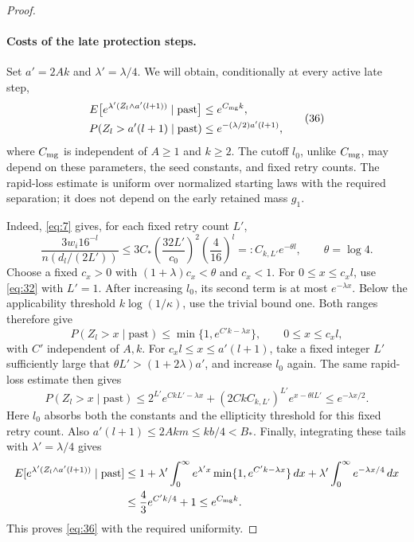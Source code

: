 \begin{proof}
\paragraph{Costs of the late protection steps.}
Set \(a'=2Ak\) and \(\lambda'=\lambda/4\). We will obtain,
conditionally at every active late step,
\[
\begin{aligned}
 E\big[e^{\lambda'(Z_l\wedge a'(l+1))}\mid\text{past}\big]
   &\le e^{C_{\rm mg}k},\\
 P(Z_l>a'(l+1)\mid\text{past})
   &\le e^{-(\lambda/2)a'(l+1)},
\end{aligned}
\tag{36}\label{eq:36}
\]
where \(C_{\rm mg}\) is independent of \(A\ge1\) and \(k\ge2\).
The cutoff \(l_0\), unlike \(C_{\rm mg}\), may depend on these
parameters, the seed constants, and fixed retry counts. The rapid-loss
estimate is uniform over normalized starting laws with the required
separation; it does not depend on the early retained mass \(g_1\).

Indeed, \eqref{eq:7} gives, for each fixed retry count \(L'\),
\[
 \frac{3w_i16^{-l}}{n(d_l/(2L'))}
 \le 3C_*\left(\frac{32L'}{c_0}\right)^2\left(\frac4{16}\right)^l
 =: C_{k,L'}e^{-\theta l},\qquad \theta=\log4.
\]
Choose a fixed \(c_x>0\) with
\((1+\lambda)c_x<\theta\) and \(c_x<1\). For
\(0\le x\le c_xl\), use \eqref{eq:32} with \(L'=1\).
After increasing \(l_0\), its second term is at most
\(e^{-\lambda x}\). Below the applicability threshold
\(k\log(1/\kappa)\), use the trivial bound one. Both ranges therefore
give
\[
 P(Z_l>x\mid\text{past})\le
 \min\{1,e^{C'k-\lambda x}\},\qquad 0\le x\le c_xl,
\]
with \(C'\) independent of \(A,k\).
For \(c_xl\le x\le a'(l+1)\), take a fixed integer
\(L'\) sufficiently large that
\(\theta L'>(1+2\lambda)a'\), and increase \(l_0\) again.
The same rapid-loss estimate then gives
\[
 P(Z_l>x\mid\text{past})
 \le 2^{L'}e^{CkL'-\lambda x}
       +(2CkC_{k,L'})^{L'}e^{x-\theta lL'}
 \le e^{-\lambda x/2}.
\]
Here \(l_0\) absorbs both the constants and the ellipticity threshold
for this fixed retry count. Also
\(a'(l+1)\le2Akm\le kb/4<B_*\).
Finally, integrating these tails with \(\lambda'=\lambda/4\) gives
\[
\begin{split}
 E[e^{\lambda'(Z_l\wedge a'(l+1))}\mid\text{past}]
 &\le 1+\lambda'\int_0^\infty e^{\lambda'x}
                  \min\{1,e^{C'k-\lambda x}\}\,dx
       +\lambda'\int_0^\infty e^{-\lambda x/4}\,dx\\
 &\le \frac43 e^{C'k/4}+1\le e^{C_{\rm mg}k}.
\end{split}
\]
This proves \eqref{eq:36} with the required uniformity.


\end{proof}
